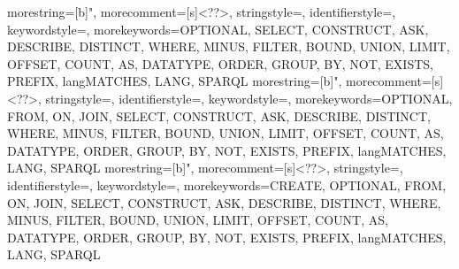 
{%
	morestring=[b]",
	morecomment=[s]{<?}{?>},
	stringstyle=\ttfamily\color{black},
	identifierstyle=\ttfamily\color{black},
	keywordstyle=\ttfamily\color{blue},
	morekeywords={OPTIONAL, SELECT, CONSTRUCT, ASK, DESCRIBE, DISTINCT, WHERE, MINUS, FILTER, BOUND, UNION, LIMIT, OFFSET, COUNT, AS, DATATYPE, ORDER, GROUP, BY, NOT, EXISTS, PREFIX, langMATCHES, LANG, SPARQL}
}
{%
	morestring=[b]",
	morecomment=[s]{<?}{?>},
	stringstyle=\ttfamily\color{black},
	identifierstyle=\ttfamily\color{black},
	keywordstyle=\ttfamily\color{blue},
	morekeywords={OPTIONAL, FROM, ON, JOIN, SELECT, CONSTRUCT, ASK, DESCRIBE, DISTINCT, WHERE, MINUS, FILTER, BOUND, UNION, LIMIT, OFFSET, COUNT, AS, DATATYPE, ORDER, GROUP, BY, NOT, EXISTS, PREFIX, langMATCHES, LANG, SPARQL}
}
{%
	morestring=[b]",
	morecomment=[s]{<?}{?>},
	stringstyle=\ttfamily\color{black},
	identifierstyle=\ttfamily\color{black},
	keywordstyle=\ttfamily\color{blue},
	morekeywords={CREATE, OPTIONAL, FROM, ON, JOIN, SELECT, CONSTRUCT, ASK, DESCRIBE, DISTINCT, WHERE, MINUS, FILTER, BOUND, UNION, LIMIT, OFFSET, COUNT, AS, DATATYPE, ORDER, GROUP, BY, NOT, EXISTS, PREFIX, langMATCHES, LANG, SPARQL}
}

